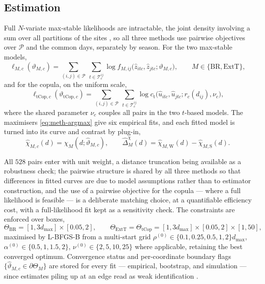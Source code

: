 \subsection{Estimation}\label{sec:meth-cl}

Full \(N\)-variate max-stable likelihoods are intractable, the joint density involving a sum over all partitions of the sites \citep{padoan2010}, so all three methods use pairwise objectives over \(\mathcal P\) and the common days, separately by season. For the two max-stable models,
\begin{equation}\label{eq:meth-cl-ms}
  \ell_{M,c}(\vartheta_{M,c})
  =\sum_{(i,j)\in\mathcal P}\ \sum_{t\in\mathcal T^{ij}_c}
  \log f_{M,ij}\!\bigl(\widehat z_{itc},\widehat z_{jtc};\vartheta_{M,c}\bigr),
  \qquad M\in\{\mathrm{BR},\mathrm{ExtT}\},
\end{equation}
and for the copula, on the uniform scale,
\begin{equation}\label{eq:meth-cl-tcop}
  \ell_{\mathrm{tCop},c}(\vartheta_{\mathrm{tCop},c})
  =\sum_{(i,j)\in\mathcal P}\ \sum_{t\in\mathcal T^{ij}_c}
  \log c_{\mathrm t}\!\bigl(\widehat u_{itc},\widehat u_{jtc};r_c(d_{ij}),\nu_c\bigr),
\end{equation}
where the shared parameter \(\nu_c\) couples all pairs in the two \(t\)-based models. The maximisers \eqref{eq:meth-argmax} give six empirical fits, and each fitted model is turned into its curve and contrast by plug-in,
\begin{equation}\label{eq:meth-output}
  \widehat\chi_{M,c}(d)=\chi_M(d;\widehat\vartheta_{M,c}),
  \qquad
  \widehat\Delta_M^{\chi}(d)=\widehat\chi_{M,\mathrm W}(d)-\widehat\chi_{M,\mathrm S}(d).
\end{equation}

All \(528\) pairs enter with unit weight, a distance truncation being available as a robustness check; the pairwise structure is shared by all three methods so that differences in fitted curves are due to model assumptions rather than to estimator construction, and the use of a pairwise objective for the copula --- where a full likelihood is feasible --- is a deliberate matching choice, at a quantifiable efficiency cost, with a full-likelihood fit kept as a sensitivity check. The constraints are enforced over boxes,
\begin{equation}
  \Theta_{\mathrm{BR}}=[1,3d_{\max}]\times[0.05,2],
  \qquad
  \Theta_{\mathrm{ExtT}}=\Theta_{\mathrm{tCop}}=[1,3d_{\max}]\times[0.05,2]\times[1,50],
\end{equation}
maximised by L-BFGS-B from a multi-start grid \(\rho^{(0)}\in\{0.1,0.25,0.5,1,2\}d_{\max}\), \(\alpha^{(0)}\in\{0.5,1,1.5,2\}\), \(\nu^{(0)}\in\{2,5,10,25\}\) where applicable, retaining the best converged optimum. Convergence status and per-coordinate boundary flags \(\{\widehat\vartheta_{M,c}\in\partial\Theta_M\}\) are stored for every fit --- empirical, bootstrap, and simulation --- since estimates piling up at an edge read as weak identification \citep{andrews2001}.

